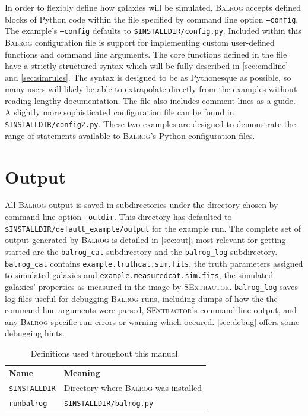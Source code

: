 \documentclass[12pt]{book}
\newcommand{\py}{Python}
\newcommand{\balrog}{\textsc{Balrog}}
\newcommand{\sex}{\textsc{SExtractor}}
\newcommand{\opt}[1]{\texttt{--#1}}
\begin{document}
In order to flexibly define how galaxies will be simulated, \balrog{} accepts defined blocks of \py{} code
within the file specified by command line option \opt{config}.
The example's \opt{config} defaults to \texttt{\$INSTALLDIR/config.py}.
Included within this \balrog{} configuration file is support for implementing custom user-defined functions 
and command line arguments.
The core functions defined in the file have a strictly
structured syntax which will be fully described in \autoref{sec:cmdline} and \autoref{sec:simrules}. The syntax is designed to be as \py esque as possible, so
many users will likely be able to extrapolate directly from the examples without reading lengthy documentation. The file also
includes comment lines as a guide. A slightly more sophisticated configuration file can be found in \texttt{\$INSTALLDIR/config2.py}.
These two examples are designed to demonstrate the range of statements available to \balrog{}'s \py{} configuration files.


\section{Output}
\label{sec:output}

All \balrog{} output is saved in subdirectories under the directory chosen by command line option \opt{outdir}.
This directory has defaulted to \texttt{\$INSTALLDIR/default\_example/output} for the example run.
The complete set of output generated by \balrog{} is detailed in \autoref{sec:out};
most relevant for getting started are the \texttt{balrog\_cat} subdirectory and the \texttt{balrog\_log} subdirectory.
\texttt{balrog\_cat} contains \texttt{example.truthcat.sim.fits}, the truth parameters assigned to simulated galaxies
and \texttt{example.measuredcat.sim.fits}, the simulated galaxies' properties as measured in the image by \sex{}.
\texttt{balrog\_log} saves log files useful for debugging \balrog{} runs, including dumps of how the the command line
arguments were parsed, \sex{}'s command line output, and any \balrog{} specific run errors or warning which occured.
\autoref{sec:debug} offers some debugging hints.


\begin{table}[h]
\caption{Definitions used throughout this manual.}
\label{tab:def}
\begin{tabular}{l l}
\underline{\textbf{Name}} & \underline{\textbf{Meaning}} \\
\texttt{\$INSTALLDIR} & Directory where \balrog{} was installed \\
\texttt{runbalrog} & \texttt{\$INSTALLDIR/balrog.py} \\
\end{tabular}
\end{table}
\end{document}
